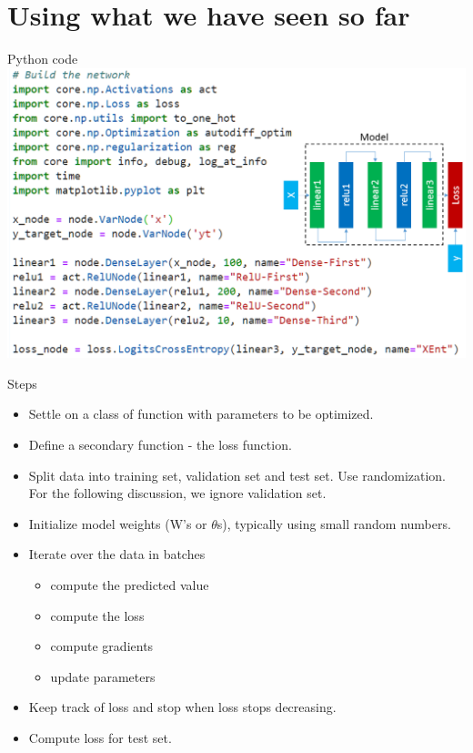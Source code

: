 \section{Using what we have seen so far}

\begin{frame}{Python code}
\includegraphics[width=.9\textwidth, center]{figuras/3layer_autodiff_example_with_network.png}	
\end{frame}

\begin{frame}{Steps}
	\begin{itemize}
		\item Settle on a class of function with parameters  to be optimized. 
		 
		\item Define a secondary function - the loss function.  
		 
		\item Split data into  training set, validation set and test 
		set. Use randomization. For the following discussion, we ignore validation set. 
		
		\item Initialize model weights (W's or $\theta$s), typically using 
		small random numbers.
	  
		\item Iterate over the data in batches  
		\begin{itemize}
			\item compute the predicted value
			\item compute the loss 
			\item compute gradients 
			\item update parameters
		\end{itemize}
		\item Keep track of loss and stop when loss stops decreasing.
		\item Compute loss for test set.   
	\end{itemize}
\end{frame}

